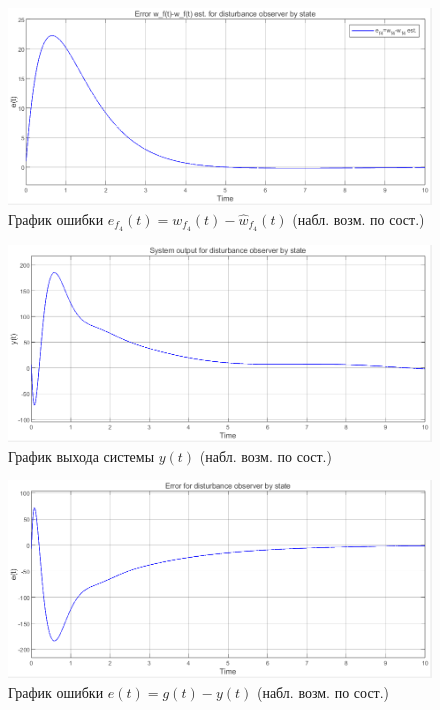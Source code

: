 \documentclass[a4paper, 12pt]{article}
\begin{document}
    \begin{figure}[H]
        \centering
        \includegraphics[scale=0.6]{3task_ef4.png}
        \captionsetup{skip=0pt}
        \caption{График ошибки $e_{f_4}(t)=w_{f_4}(t)-\hat{w}_{f_4}(t)$ (набл. возм. по сост.)}
        \label{fig:3task_ef4}
    \end{figure}
    \begin{figure}[H]
        \centering
        \includegraphics[scale=0.6]{3task_y1.png}
        \captionsetup{skip=0pt}
        \caption{График выхода системы $y(t)$ (набл. возм. по сост.)}
        \label{fig:3task_y1}
    \end{figure}
    \begin{figure}[H]
        \centering
        \includegraphics[scale=0.6]{3task_ey1.png}
        \captionsetup{skip=0pt}
        \caption{График ошибки $e(t)=g(t)-y(t)$ (набл. возм. по сост.)}
        \label{fig:3task_ey1}
    \end{figure}
\end{document}

